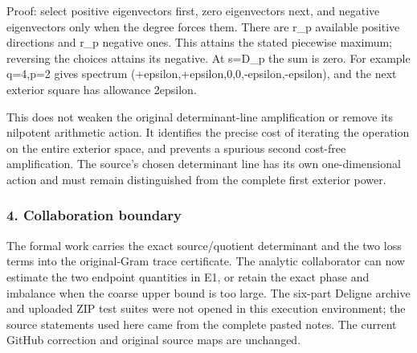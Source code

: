 Proof: select positive eigenvectors first, zero eigenvectors next, and negative eigenvectors only when the degree forces them. There are r\_p available positive directions and r\_p negative ones. This attains the stated piecewise maximum; reversing the choices attains its negative. At s=D\_p the sum is zero. For example q=4,p=2 gives spectrum (+epsilon,+epsilon,0,0,-epsilon,-epsilon), and the next exterior square has allowance 2epsilon.

This does not weaken the original determinant-line amplification or remove its nilpotent arithmetic action. It identifies the precise cost of iterating the operation on the entire exterior space, and prevents a spurious second cost-free amplification. The source's chosen determinant line has its own one-dimensional action and must remain distinguished from the complete first exterior power.

\subsubsection{4. Collaboration boundary}\label{endpoint-pr23_corrected--collaboration-boundary}

The formal work carries the exact source/quotient determinant and the two loss terms into the original-Gram trace certificate. The analytic collaborator can now estimate the two endpoint quantities in E1, or retain the exact phase and imbalance when the coarse upper bound is too large. The six-part Deligne archive and uploaded ZIP test suites were not opened in this execution environment; the source statements used here came from the complete pasted notes. The current GitHub correction and original source maps are unchanged.
